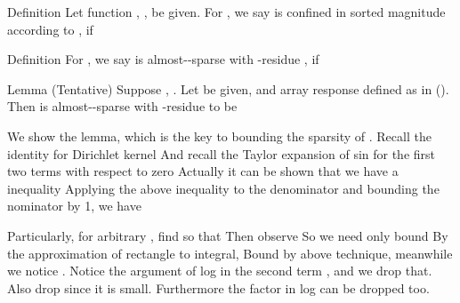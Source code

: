 \Result
{Definition}
{
Let function , , be given.
For , we say  is confined in sorted magnitude according to , if
}

\Result
{Definition}
{
For , we say  is almost--sparse with -residue , if
}

\Result
{Lemma (Tentative)}
{
Suppose , .
Let \m {\f} be given, and array response  defined as in ().
Then  is almost--sparse with -residue  to be
%
}

We show the lemma, which is the key to bounding the sparsity of .
Recall the identity for Dirichlet kernel
%
%
And recall the Taylor expansion of sin for the first two terms with respect to zero
%
%
Actually it can be shown that we have a inequality
%
%
Applying the above inequality to the denominator and bounding the nominator by 1, we have
%

Particularly, for arbitrary \m {\f}, find  so that
%
Then observe
So we need only bound
By the approximation of rectangle to integral,
Bound  by above technique, meanwhile we notice .
Notice the argument of log in the second term , and we drop that.
Also drop  since it is small.
Furthermore the \m {2\pi} factor in log can be dropped too.


